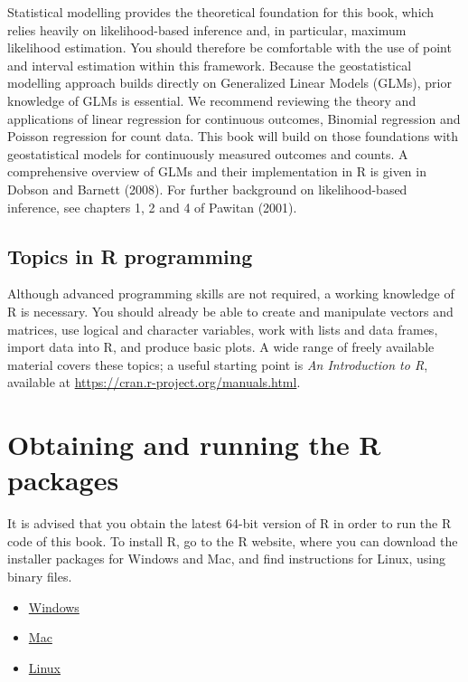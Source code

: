 \documentclass[
  letterpaper,
]{krantz}
\providecommand{\tightlist}{%
  \setlength{\itemsep}{0pt}\setlength{\parskip}{0pt}}
\begin{document}
Statistical modelling provides the theoretical foundation for this book,
which relies heavily on likelihood-based inference and, in particular,
maximum likelihood estimation. You should therefore be comfortable with
the use of point and interval estimation within this framework. Because
the geostatistical modelling approach builds directly on Generalized
Linear Models (GLMs), prior knowledge of GLMs is essential. We recommend
reviewing the theory and applications of linear regression for
continuous outcomes, Binomial regression and Poisson regression for
count data. This book will build on those foundations with
geostatistical models for continuously measured outcomes and counts. A
comprehensive overview of GLMs and their implementation in R is given in
Dobson and Barnett (2008). For further background on likelihood-based
inference, see chapters 1, 2 and 4 of Pawitan (2001).

\subsection{Topics in R programming}\label{topics-in-r-programming}

Although advanced programming skills are not required, a working
knowledge of R is necessary. You should already be able to create and
manipulate vectors and matrices, use logical and character variables,
work with lists and data frames, import data into R, and produce basic
plots. A wide range of freely available material covers these topics; a
useful starting point is \emph{An Introduction to R}, available at
\url{https://cran.r-project.org/manuals.html}.

\section{Obtaining and running the R
packages}\label{obtaining-and-running-the-r-packages}

It is advised that you obtain the latest 64-bit version of R in order to
run the R code of this book. To install R, go to the R website, where
you can download the installer packages for Windows and Mac, and find
instructions for Linux, using binary files.

\begin{itemize}
\tightlist
\item
  \href{https://cran.r-project.org/bin/windows/base/}{Windows}
\item
  \href{https://cran.r-project.org/bin/macosx}{Mac}
\item
  \href{https://cran.r-project.org/bin/linux}{Linux}
\end{itemize}
\end{document}
